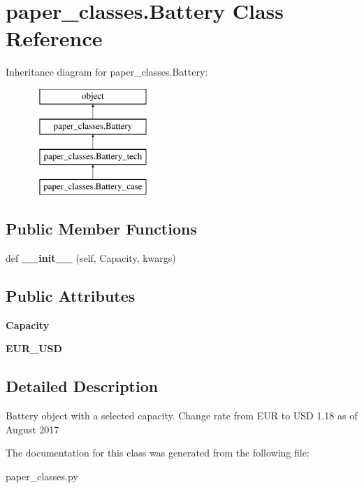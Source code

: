 \hypertarget{classpaper__classes_1_1_battery}{}\section{paper\+\_\+classes.\+Battery Class Reference}
\label{classpaper__classes_1_1_battery}
Inheritance diagram for paper\+\_\+classes.\+Battery\+:\begin{figure}[H]
\begin{center}
\leavevmode
\includegraphics[height=4.000000cm]{classpaper__classes_1_1_battery}
\end{center}
\end{figure}
\subsection*{Public Member Functions}
\begin{DoxyCompactItemize}
\item 
\mbox{\label{classpaper__classes_1_1_battery_af664991943d5eec036946ed467712bdc}} 
def {\bfseries \+\_\+\+\_\+init\+\_\+\+\_\+} (self, Capacity, kwargs)
\end{DoxyCompactItemize}
\subsection*{Public Attributes}
\begin{DoxyCompactItemize}
\item 
\mbox{\label{classpaper__classes_1_1_battery_adba760f1072124b97d5109eae61aead4}} 
{\bfseries Capacity}
\item 
\mbox{\label{classpaper__classes_1_1_battery_ae724457355c1f49c66325d1fe4053adf}} 
{\bfseries E\+U\+R\+\_\+\+U\+SD}
\end{DoxyCompactItemize}


\subsection{Detailed Description}
\begin{DoxyVerb}Battery object with a selected capacity.
Change rate from EUR to USD 1.18 as of August 2017
\end{DoxyVerb}
 

The documentation for this class was generated from the following file\+:\begin{DoxyCompactItemize}
\item 
paper\+\_\+classes.\+py\end{DoxyCompactItemize}

